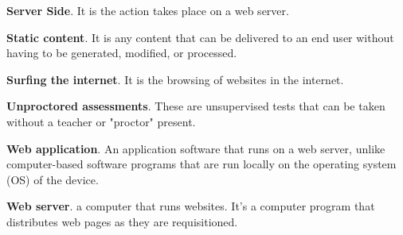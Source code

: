 \textbf{Server Side}.
It is the action takes place on a web server.

\textbf{Static content}.
It is any content that can be delivered to an end user without having to be generated, modified, or processed.

\textbf{Surfing the internet}.
It is the browsing of websites in the internet.

\textbf{Unproctored assessments}.
These are unsupervised tests that can be taken without a teacher or "proctor" present.

\textbf{Web application}.
An application software that runs on a web server, unlike computer-based software programs that are run locally on the operating system (OS) of the device.

\textbf{Web server}.
a computer that runs websites. It's a computer program that distributes web pages as they are requisitioned.
